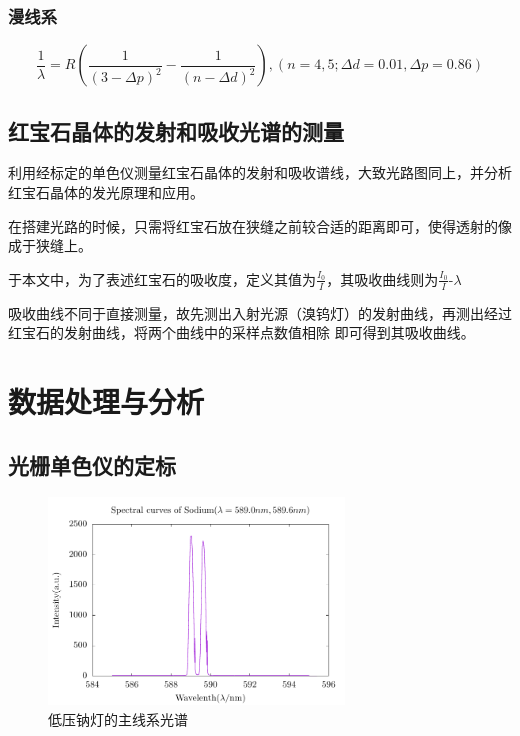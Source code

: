 \documentclass[a4paper,UTF8]{ctexart}
\begin{document}
\subsubsection{漫线系}

\begin{equation}
    \frac{1}{\lambda} = R(\frac{1}{(3-\Delta p)^2}-\frac{1}{(n-\Delta d)^2}) , (n=4,5;\Delta d = 0.01,\Delta p = 0.86)
\end{equation}

\subsection{红宝石晶体的发射和吸收光谱的测量}

利用经标定的单色仪测量红宝石晶体的发射和吸收谱线，大致光路图同上，并分析红宝石晶体的发光原理和应用。

在搭建光路的时候，只需将红宝石放在狭缝之前较合适的距离即可，使得透射的像成于狭缝上。

于本文中，为了表述红宝石的吸收度，定义其值为$\frac{I_0}{I}$，其吸收曲线则为$\frac{I_0}{I}$-$\lambda$

吸收曲线不同于直接测量，故先测出入射光源（溴钨灯）的发射曲线，再测出经过红宝石的发射曲线，将两个曲线中的采样点数值相除
即可得到其吸收曲线。

\section{数据处理与分析}

\subsection{光栅单色仪的定标}

\begin{figure}[H]
    \centering
    \begin{minipage}[b]{0.9\textwidth}
        \centering
        \includegraphics[width=0.7\textwidth]{./na_0.pdf}
        \caption{低压钠灯的主线系光谱}
    \end{minipage}
\end{figure}
\end{document}

